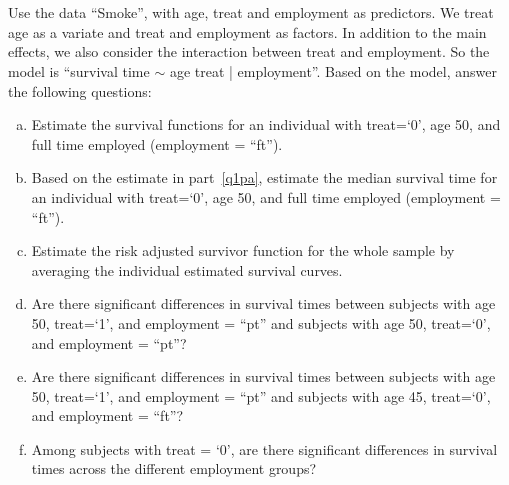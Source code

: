 \documentclass{elegantbook}
\begin{document}
 

\setcounter{chapter}{5}
\chapter{}

\begin{exercise*}[1]
    Use the data ``Smoke'', with age, treat and employment as predictors. We treat age as a variate and treat and employment as factors. In addition to the main effects, we also consider the interaction between treat and employment. So the model is ``survival time $\sim$ age treat | employment''. Based on the model, answer the following questions: 
    \begin{enumerate}[a)]
        \item Estimate the survival functions for an individual with treat=`0', age 50, and full time employed (employment = “ft”).\label{q1pa}
        \item Based on the estimate in part~\ref{q1pa}, estimate the median survival time for an individual with treat=`0', age 50, and full time employed (employment = “ft”). 
        \item Estimate the risk adjusted survivor function for the whole sample by averaging the individual estimated survival curves. 
        \item Are there significant differences in survival times between subjects with age 50, treat=`1', and employment = “pt” and subjects with age 50, treat=`0', and employment = “pt”? 
        \item Are there significant differences in survival times between subjects with age 50, treat=`1', and employment = “pt” and subjects with age 45, treat=`0', and employment = “ft”?
        \item Among subjects with treat = `0', are there significant differences in survival times across the different employment groups? 
    \end{enumerate}
\end{exercise*}
\end{document}
